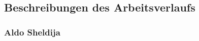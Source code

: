 \chapter{\docname}

\label{\docname}
\section{Beschreibungen des Arbeitsverlaufs}
\subsection{Aldo Sheldija}


